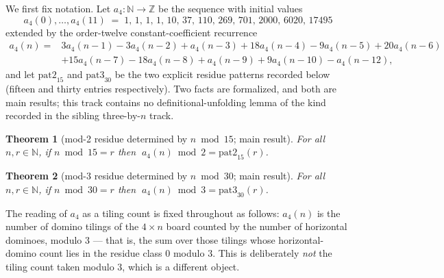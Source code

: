 \documentclass[11pt]{article}
\newtheorem{theorem}{Theorem}
\begin{document}
We first fix notation. Let $a_4\colon\mathbb{N}\to\mathbb{Z}$ be the sequence with initial
values
\[
a_4(0),\dots,a_4(11) \;=\; 1,\,1,\,1,\,1,\,10,\,37,\,110,\,269,\,701,\,2000,\,6020,\,17495
\]
extended by the order-twelve constant-coefficient recurrence
\[
\begin{aligned}
a_4(n) ={}& 3a_4(n{-}1) - 3a_4(n{-}2) + a_4(n{-}3) + 18a_4(n{-}4) - 9a_4(n{-}5) + 20a_4(n{-}6) \\
& + 15a_4(n{-}7) - 18a_4(n{-}8) + a_4(n{-}9) + 9a_4(n{-}10) - a_4(n{-}12),
\end{aligned}
\]
and let $\mathrm{pat2}_{15}$ and $\mathrm{pat3}_{30}$ be the two explicit residue patterns
recorded below (fifteen and thirty entries respectively). Two facts are formalized, and both
are main results; this track contains no definitional-unfolding lemma of the kind recorded
in the sibling three-by-$n$ track.

\begin{theorem}[mod-2 residue determined by $n \bmod 15$; main result]
\label{thm:t4a}
For all $n, r \in \mathbb{N}$, if $n \bmod 15 = r$ then
$\;a_4(n) \bmod 2 = \mathrm{pat2}_{15}(r)$.
\end{theorem}

\begin{theorem}[mod-3 residue determined by $n \bmod 30$; main result]
\label{thm:t4b}
For all $n, r \in \mathbb{N}$, if $n \bmod 30 = r$ then
$\;a_4(n) \bmod 3 = \mathrm{pat3}_{30}(r)$.
\end{theorem}

The reading of $a_4$ as a tiling count is fixed throughout as follows: $a_4(n)$ is the
number of domino tilings of the $4\times n$ board counted by the number of horizontal
dominoes, modulo 3 --- that is, the sum over those tilings whose horizontal-domino count lies
in the residue class $0$ modulo $3$. This is deliberately \emph{not} the tiling count taken
modulo $3$, which is a different object.
\end{document}
